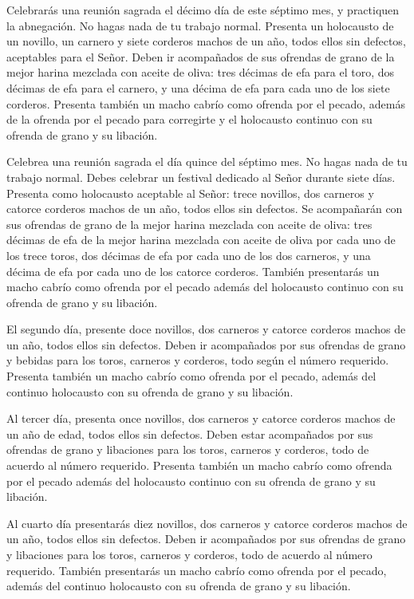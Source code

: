  Celebrarás una reunión sagrada el décimo día de este
séptimo mes, y practiquen la abnegación. No hagas nada de tu trabajo
normal.  Presenta un holocausto de un novillo, un carnero y
siete corderos machos de un año, todos ellos sin defectos, aceptables
para el Señor.  Deben ir acompañados de sus ofrendas de
grano de la mejor harina mezclada con aceite de oliva: tres décimas de
efa para el toro, dos décimas de efa para el carnero,  y
una décima de efa para cada uno de los siete corderos. 
Presenta también un macho cabrío como ofrenda por el pecado, además de
la ofrenda por el pecado para corregirte y el holocausto continuo con su
ofrenda de grano y su libación.

 Celebrea una reunión sagrada el día quince del séptimo
mes. No hagas nada de tu trabajo normal. Debes celebrar un festival
dedicado al Señor durante siete días.  Presenta como
holocausto aceptable al Señor: trece novillos, dos carneros y catorce
corderos machos de un año, todos ellos sin defectos.  Se
acompañarán con sus ofrendas de grano de la mejor harina mezclada con
aceite de oliva: tres décimas de efa de la mejor harina mezclada con
aceite de oliva por cada uno de los trece toros, dos décimas de efa por
cada uno de los dos carneros,  y una décima de efa por cada
uno de los catorce corderos.  También presentarás un macho
cabrío como ofrenda por el pecado además del holocausto continuo con su
ofrenda de grano y su libación.

 El segundo día, presente doce novillos, dos carneros y
catorce corderos machos de un año, todos ellos sin defectos.
 Deben ir acompañados por sus ofrendas de grano y bebidas
para los toros, carneros y corderos, todo según el número requerido.
 Presenta también un macho cabrío como ofrenda por el
pecado, además del continuo holocausto con su ofrenda de grano y su
libación.

 Al tercer día, presenta once novillos, dos carneros y
catorce corderos machos de un año de edad, todos ellos sin defectos.
 Deben estar acompañados por sus ofrendas de grano y
libaciones para los toros, carneros y corderos, todo de acuerdo al
número requerido.  Presenta también un macho cabrío como
ofrenda por el pecado además del holocausto continuo con su ofrenda de
grano y su libación.

 Al cuarto día presentarás diez novillos, dos carneros y
catorce corderos machos de un año, todos ellos sin defectos.
 Deben ir acompañados por sus ofrendas de grano y
libaciones para los toros, carneros y corderos, todo de acuerdo al
número requerido.  También presentarás un macho cabrío como
ofrenda por el pecado, además del continuo holocausto con su ofrenda de
grano y su libación.

